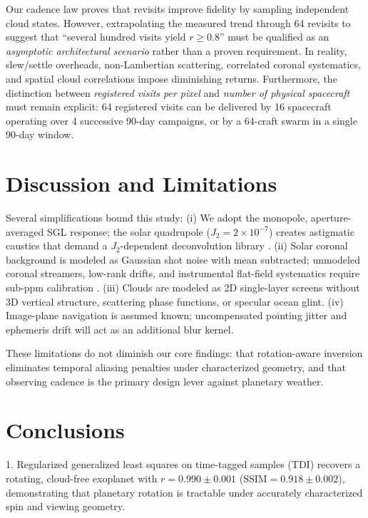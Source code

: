 \documentclass[twocolumn,10pt]{article}
\begin{document}
 Our cadence law proves that
revisits improve fidelity by sampling independent cloud states. However,
extrapolating the measured trend through 64 revisits to suggest that
``several hundred visits yield $r\ge0.8$'' must be qualified as an
{\it asymptotic architectural scenario} rather than a proven requirement.
In reality, slew/settle overheads, non-Lambertian scattering, correlated
coronal systematics, and spatial cloud correlations impose diminishing returns.
Furthermore, the distinction between {\it registered visits per pixel} and
{\it number of physical spacecraft} must remain explicit: 64 registered visits
can be delivered by 16 spacecraft operating over 4 successive 90-day campaigns,
or by a 64-craft swarm in a single 90-day window.

\section{Discussion and Limitations}
\label{sec:discussion}

Several simplifications bound this study:
(i) We adopt the monopole, aperture-averaged SGL response; the solar
quadrupole ($J_2=2\times10^{-7}$) creates astigmatic caustics that demand
a $J_2$-dependent deconvolution library \citep{tt21quad}.
(ii) Solar coronal background is modeled as Gaussian shot noise with mean
subtracted; unmodeled coronal streamers, low-rank drifts, and instrumental
flat-field systematics require sub-ppm calibration \citep{tur26bench}.
(iii) Clouds are modeled as 2D single-layer screens without 3D vertical
structure, scattering phase functions, or specular ocean glint.
(iv) Image-plane navigation is assumed known; uncompensated pointing jitter
and ephemeris drift will act as an additional blur kernel.

These limitations do not diminish our core findings: that rotation-aware
inversion eliminates temporal aliasing penalties under characterized geometry,
and that observing cadence is the primary design lever against planetary weather.

\section{Conclusions}
\label{sec:conclusions}

1. Regularized generalized least squares on time-tagged samples (TDI) recovers
a rotating, cloud-free exoplanet with $r=0.990\pm0.001$ ($\mathrm{SSIM}=0.918\pm0.002$),
demonstrating that planetary rotation is tractable under accurately characterized
spin and viewing geometry.
\end{document}
